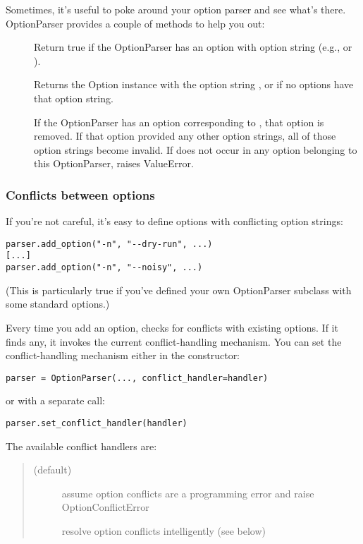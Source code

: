 Sometimes, it's useful to poke around your option parser and see what's
there.  OptionParser provides a couple of methods to help you out:
\begin{description}
\item[]
Return true if the OptionParser has an option with 
option string  (e.g.,  or ).
\item[]
Returns the Option instance with the option string , or
 if no options have that option string.
\item[]
If the OptionParser has an option corresponding to ,
that option is removed.  If that option provided any other
option strings, all of those option strings become invalid.
If  does not occur in any option belonging to this
OptionParser, raises ValueError.
\end{description}


\subsubsection{Conflicts between options\label{optparse-conflicts-between-options}}

If you're not careful, it's easy to define options with conflicting
option strings:
\begin{verbatim}
parser.add_option("-n", "--dry-run", ...)
[...]
parser.add_option("-n", "--noisy", ...)
\end{verbatim}

(This is particularly true if you've defined your own OptionParser
subclass with some standard options.)

Every time you add an option,  checks for conflicts with existing
options.  If it finds any, it invokes the current conflict-handling
mechanism.  You can set the conflict-handling mechanism either in the
constructor:
\begin{verbatim}
parser = OptionParser(..., conflict_handler=handler)
\end{verbatim}

or with a separate call:
\begin{verbatim}
parser.set_conflict_handler(handler)
\end{verbatim}

The available conflict handlers are:
\begin{quote}
\begin{description}
\item[ (default)]
assume option conflicts are a programming error and raise 
OptionConflictError
\item[]
resolve option conflicts intelligently (see below)
\end{description}
\end{quote}

